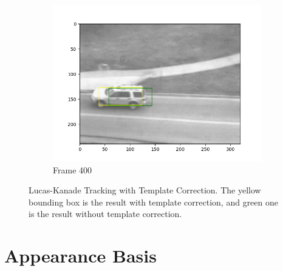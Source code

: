 \documentclass{article} %
\begin{document}
\begin{figure}[H]
\begin{subfigure}[b]{0.30\textwidth}
            \includegraphics[width=\textwidth]{q1,4_frame400.png}
            \caption{Frame 400}
        \end{subfigure}
        \caption{Lucas-Kanade Tracking with Template Correction. The yellow bounding box is the result with template correction, and green one is the result without template correction.}
    \end{figure}

    \section{Appearance Basis}
    
\end{document}
